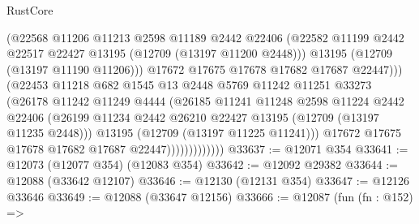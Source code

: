 \begin{lexlean}{RustCore}
\begin{coremodule}
                                (@22568
                                  @11206
                                  @11213
                                  @2598
                                  @11189
                                  @2442
                                  @22406
                                  (@22582
                                    @11199
                                    @2442
                                    @22517
                                    @22427
                                    @13195
                                    (@12709 (@13197 @11200 @2448)))
                                  @13195
                                  (@12709 (@13197 @11190 @11206)))
                                @17672
                                @17675
                                @17678
                                @17682
                                @17687
                                @22447)))
                          (@22453
                            @11218
                            @682
                            @1545
                            @13
                            @2448
                            @5769
                            @11242
                            @11251
                            @33273
                            (@26178
                              @11242
                              @11249
                              @4444
                              (@26185
                                @11241
                                @11248
                                @2598
                                @11224
                                @2442
                                @22406
                                (@26199
                                  @11234
                                  @2442
                                  @26210
                                  @22427
                                  @13195
                                  (@12709 (@13197 @11235 @2448)))
                                @13195
                                (@12709 (@13197 @11225 @11241)))
                              @17672
                              @17675
                              @17678
                              @17682
                              @17687
                              @22447)))))))))))))
@33637 := @12071 @354
@33641 := @12073 (@12077 @354) (@12083 @354)
@33642 := @12092 @29382
@33644 := @12088 (@33642 @12107)
@33646 := @12130 (@12131 @354)
@33647 := @12126 @33646
@33649 := @12088 (@33647 @12156)
@33666 := @12087
    (fun (fn : @152) =>

\end{coremodule}
\end{lexlean}

